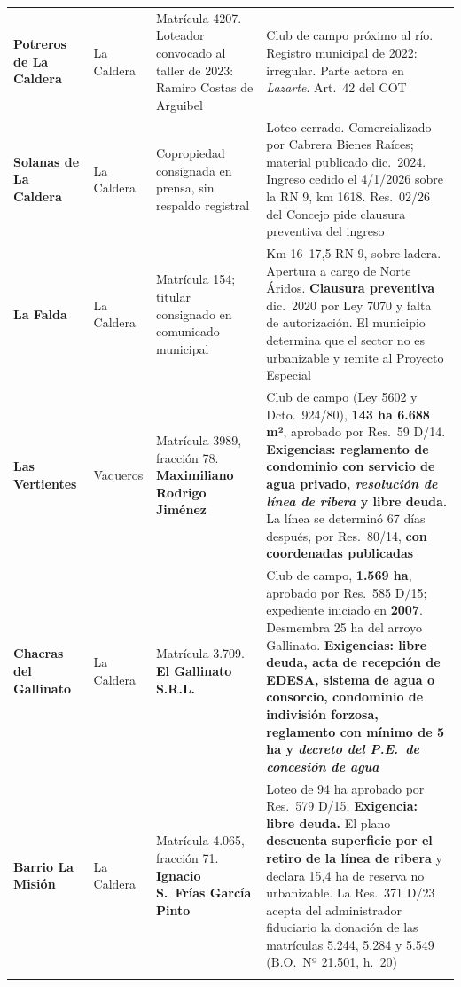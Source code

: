\begin{longtable}{@{}p{2.8cm}p{1.4cm}p{3.2cm}p{5.1cm}@{}}
\textbf{Potreros de La Caldera} & La Caldera & Matrícula 4207. Loteador convocado al taller de 2023: Ramiro Costas de Arguibel & Club de campo próximo al río. Registro municipal de 2022: irregular. Parte actora en \textit{Lazarte}. Art.\ 42 del COT \\
\addlinespace

\textbf{Solanas de La Caldera} & La Caldera & Copropiedad consignada en prensa, sin respaldo registral & Loteo cerrado. Comercializado por Cabrera Bienes Raíces; material publicado dic.\ 2024. Ingreso cedido el 4/1/2026 sobre la RN 9, km 1618. Res.\ 02/26 del Concejo pide clausura preventiva del ingreso \\
\addlinespace

\textbf{La Falda} & La Caldera & Matrícula 154; titular consignado en comunicado municipal & Km 16--17,5 RN 9, sobre ladera. Apertura a cargo de Norte Áridos. \textbf{Clausura preventiva} dic.\ 2020 por Ley 7070 y falta de autorización. El municipio determina que el sector no es urbanizable y remite al Proyecto Especial \\
\addlinespace

\textbf{Las Vertientes} & Vaqueros & Matrícula 3989, fracción 78. \textbf{Maximiliano Rodrigo Jiménez} & Club de campo (Ley 5602 y Dcto.\ 924/80), \textbf{143 ha 6.688 m²}, aprobado por Res.\ 59 D/14. \textbf{Exigencias: reglamento de condominio con servicio de agua privado, \textit{resolución de línea de ribera} y libre deuda.} La línea se determinó 67 días después, por Res.\ 80/14, \textbf{con coordenadas publicadas} \\
\addlinespace

\textbf{Chacras del Gallinato} & La Caldera & Matrícula 3.709. \textbf{El Gallinato S.R.L.} & Club de campo, \textbf{1.569 ha}, aprobado por Res.\ 585 D/15; expediente iniciado en \textbf{2007}. Desmembra 25 ha del arroyo Gallinato. \textbf{Exigencias: libre deuda, acta de recepción de EDESA, sistema de agua o consorcio, condominio de indivisión forzosa, reglamento con mínimo de 5 ha y \textit{decreto del P.E.\ de concesión de agua}} \\
\addlinespace

\textbf{Barrio La Misión} & La Caldera & Matrícula 4.065, fracción 71. \textbf{Ignacio S.\ Frías García Pinto} & Loteo de 94 ha aprobado por Res.\ 579 D/15. \textbf{Exigencia: libre deuda.} El plano \textbf{descuenta superficie por el retiro de la línea de ribera} y declara 15,4 ha de reserva no urbanizable. La Res.\ 371 D/23 acepta del administrador fiduciario la donación de las matrículas 5.244, 5.284 y 5.549 (B.O.\ Nº 21.501, h.\ 20) \\
\addlinespace


\end{longtable}
